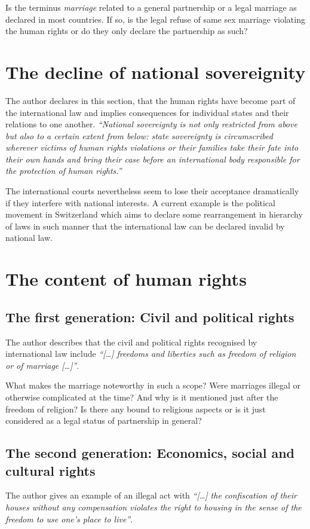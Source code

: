 Is the terminus \emph{marriage} related to a general partnership or a legal
marriage as declared in most countries. If so, is the legal refuse of same
sex marriage violating the human rights or do they only declare the
partnership as such?

\section{The decline of national sovereignity}
The author declares in this section, that the human rights have become
part of the international law and implies consequences for individual states
and their relations to one another. \emph{``National sovereignty is not only
restricted from above but also to a certain extent from below: state
sovereignty is circumscribed wherever victims of human rights violations
or their families take their fate into their own hands and bring their case
before an international body responsible for the protection of human rights.''}
\cite[p. 19,21]{tfohr}

The international courts nevertheless seem to lose their acceptance
dramatically if they interfere with national interests. A current example is
the political movement in Switzerland which aims to declare some
rearrangement in hierarchy of laws in such manner that the international law
can be declared invalid by national law.
\cite{svp}

\section{The content of human rights}

\subsection{The first generation: Civil and political rights}
The author describes that the civil and political rights recognised by
international law include \emph{``[\dots] freedoms and liberties such as
freedom of religion or of marriage [\dots]''}.
\cite[p. 21]{tfohr}

What makes the marriage noteworthy in such a scope? Were marriages
illegal or otherwise complicated at the time? And why is it mentioned
just after the freedom of religion? Is there any bound to religious
aspects or is it just considered as a legal status of partnership in
general? 

\subsection{The second generation: Economics, social and cultural rights}
The author gives an example of an illegal act with \emph{``[\dots] the
confiscation of their houses without any compensation violates the right
to housing in the sense of the freedom to use one's place to live''}.
\cite[p. 23]{tfohr}

